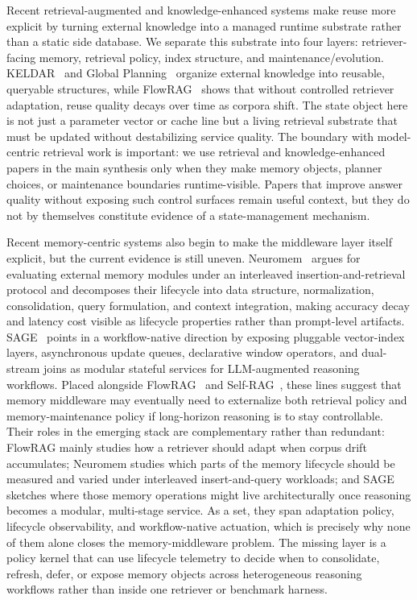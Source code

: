 \documentclass[acmsmall,screen,review]{acmart}
\begin{document}
Recent retrieval-augmented and knowledge-enhanced systems make reuse more explicit by turning external knowledge into a managed runtime substrate rather than a static side database. We separate this substrate into four layers: retriever-facing memory, retrieval policy, index structure, and maintenance/evolution. KELDAR~\cite{li2024keldar} and Global Planning~\cite{li2025global} organize external knowledge into reusable, queryable structures, while FlowRAG~\cite{zhang2026flowrag} shows that without controlled retriever adaptation, reuse quality decays over time as corpora shift. The state object here is not just a parameter vector or cache line but a living retrieval substrate that must be updated without destabilizing service quality. The boundary with model-centric retrieval work is important: we use retrieval and knowledge-enhanced papers in the main synthesis only when they make memory objects, planner choices, or maintenance boundaries runtime-visible. Papers that improve answer quality without exposing such control surfaces remain useful context, but they do not by themselves constitute evidence of a state-management mechanism.

Recent memory-centric systems also begin to make the middleware layer itself explicit, but the current evidence is still uneven. Neuromem~\cite{zhang2026neuromem} argues for evaluating external memory modules under an interleaved insertion-and-retrieval protocol and decomposes their lifecycle into data structure, normalization, consolidation, query formulation, and context integration, making accuracy decay and latency cost visible as lifecycle properties rather than prompt-level artifacts. SAGE~\cite{liu2026sage} points in a workflow-native direction by exposing pluggable vector-index layers, asynchronous update queues, declarative window operators, and dual-stream joins as modular stateful services for LLM-augmented reasoning workflows. Placed alongside FlowRAG~\cite{zhang2026flowrag} and Self-RAG~\cite{asai2024selfrag}, these lines suggest that memory middleware may eventually need to externalize both retrieval policy and memory-maintenance policy if long-horizon reasoning is to stay controllable. Their roles in the emerging stack are complementary rather than redundant: FlowRAG mainly studies how a retriever should adapt when corpus drift accumulates; Neuromem studies which parts of the memory lifecycle should be measured and varied under interleaved insert-and-query workloads; and SAGE sketches where those memory operations might live architecturally once reasoning becomes a modular, multi-stage service. As a set, they span adaptation policy, lifecycle observability, and workflow-native actuation, which is precisely why none of them alone closes the memory-middleware problem. The missing layer is a policy kernel that can use lifecycle telemetry to decide when to consolidate, refresh, defer, or expose memory objects across heterogeneous reasoning workflows rather than inside one retriever or benchmark harness.
\end{document}
